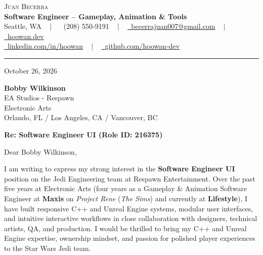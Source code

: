 \documentclass[letterpaper,11pt]{article}
\begin{document}
\begin{center}
    {\Huge \scshape Juan Becerra} \\ \vspace{4pt}
    \textbf{\large Software Engineer -- Gameplay, Animation \& Tools} \\ \vspace{4pt}
    \small Seattle, WA ~ $|$ ~
    \raisebox{-0.1\height}\faPhone\ (208) 550-9191 ~ $|$ ~
    \href{mailto:becerrajuan007@gmail.com}{\raisebox{-0.2\height}\faEnvelope\ \underline{becerrajuan007@gmail.com}} ~ $|$ ~
    \href{https://hoowan.dev}{\raisebox{-0.2\height}\faGlobe\ \underline{hoowan.dev}} \\ \vspace{2pt}
    \href{https://linkedin.com/in/hoowan/}{\raisebox{-0.2\height}\faLinkedin\ \underline{linkedin.com/in/hoowan}} ~ $|$ ~
    \href{https://github.com/hoowan-dev}{\raisebox{-0.2\height}\faGithub\ \underline{github.com/hoowan-dev}}
\end{center}

\vspace{4pt}
\hrule
\vspace{14pt}

\noindent October 26, 2026

\vspace{8pt}
\noindent \textbf{Bobby Wilkinson} \\
EA Studios - Respawn \\
Electronic Arts \\
Orlando, FL / Los Angeles, CA / Vancouver, BC

\vspace{8pt}
\noindent \textbf{Re: Software Engineer UI (Role ID: 216375)}

\vspace{8pt}
\noindent Dear Bobby Wilkinson,

I am writing to express my strong interest in the \textbf{Software Engineer UI} position on the 
Jedi Engineering team at Respawn Entertainment. Over the past five years at Electronic Arts (four 
years as a Gameplay \& Animation Software Engineer at \textbf{Maxis} on \emph{Project Rene} 
(\emph{The Sims}) and currently at \textbf{Lifestyle}), I have built responsive C++ and Unreal 
Engine systems, modular user interfaces, and intuitive interactive workflows in close 
collaboration with designers, technical artists, QA, and production. I would be thrilled to bring 
my C++ and Unreal Engine expertise, ownership mindset, and passion for polished player experiences 
to the Star Wars Jedi team.
\end{document}
